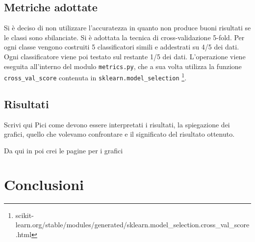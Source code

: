 \documentclass[12pt,a4paper,oneside,hidelinks]{report}
\begin{document}
\section{Metriche adottate}
Si è deciso di non utilizzare l'accuratezza in quanto non produce buoni risultati se le classi sono sbilanciate.  
Si è adottata la tecnica di cross-validazione 5-fold. Per ogni classe vengono costruiti 5 classificatori simili e addestrati su 4/5 dei dati. Ogni classificatore viene poi testato sul restante 1/5 dei dati.
L'operazione viene eseguita all'interno del modulo \texttt{metrics.py}, 
che a sua volta utilizza la funzione \texttt{cross\_val\_score} contenuta in 
\texttt{sklearn.model\_selection} 
\footnote{scikit-learn.org/stable/modules/generated/sklearn.model\_selection.cross\_val\_score.html}. 

\section{Risultati}
Scrivi qui Pici come devono essere interpretati i risultati, la spiegazione dei grafici, quello che volevamo confrontare e il significato del risultato ottenuto.

Da qui in poi crei le pagine per i grafici 

\chapter{Conclusioni}
\end{document}
